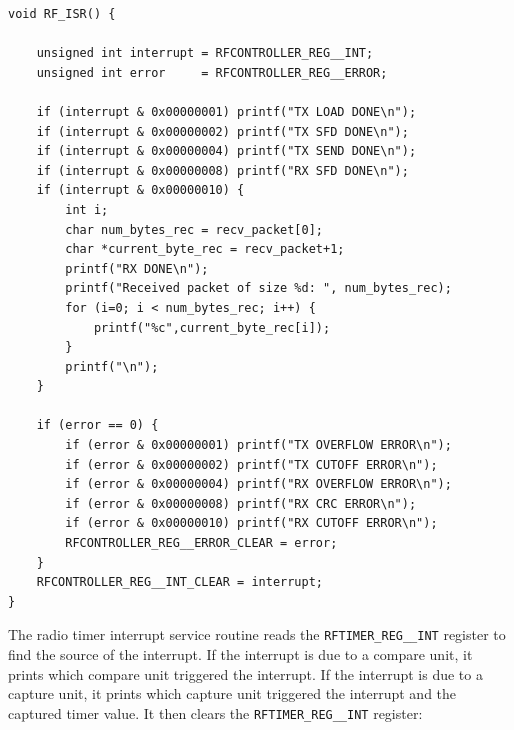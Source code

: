 \begin{lstlisting}
void RF_ISR() {

    unsigned int interrupt = RFCONTROLLER_REG__INT;
    unsigned int error     = RFCONTROLLER_REG__ERROR;

    if (interrupt & 0x00000001) printf("TX LOAD DONE\n");
    if (interrupt & 0x00000002) printf("TX SFD DONE\n");
    if (interrupt & 0x00000004) printf("TX SEND DONE\n");
    if (interrupt & 0x00000008) printf("RX SFD DONE\n");
    if (interrupt & 0x00000010) {
        int i;
        char num_bytes_rec = recv_packet[0];
        char *current_byte_rec = recv_packet+1;
        printf("RX DONE\n");
        printf("Received packet of size %d: ", num_bytes_rec);
        for (i=0; i < num_bytes_rec; i++) {
            printf("%c",current_byte_rec[i]);
        }
        printf("\n");
    }

    if (error == 0) {
        if (error & 0x00000001) printf("TX OVERFLOW ERROR\n");
        if (error & 0x00000002) printf("TX CUTOFF ERROR\n");
        if (error & 0x00000004) printf("RX OVERFLOW ERROR\n");
        if (error & 0x00000008) printf("RX CRC ERROR\n");
        if (error & 0x00000010) printf("RX CUTOFF ERROR\n");
        RFCONTROLLER_REG__ERROR_CLEAR = error;
    }
    RFCONTROLLER_REG__INT_CLEAR = interrupt;
}
\end{lstlisting}

The radio timer interrupt service routine reads the \texttt{RFTIMER\_REG\_\_INT} register to find the source of the interrupt. If the interrupt is due to a compare unit, it prints which compare unit triggered the interrupt. If the interrupt is due to a capture unit, it prints which capture unit triggered the interrupt and the captured timer value. It then clears the \texttt{RFTIMER\_REG\_\_INT} register:

